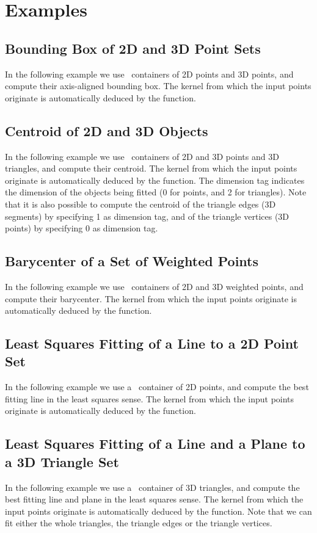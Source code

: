 \section{Examples\label{subsec:pca_examples}}

\subsection{Bounding Box of 2D and 3D Point Sets}
In the following example we use \stl\ containers of 2D points and 3D points, and compute their axis-aligned bounding box. The kernel from which the input points originate is automatically deduced by the function.

\subsection{Centroid of 2D and 3D Objects}
In the following example we use \stl\ containers of 2D and 3D points and 3D triangles, and compute their centroid. The kernel from which the input points originate is automatically deduced by the function. The dimension tag indicates the dimension of the objects being fitted (0 for points, and 2 for triangles). Note that it is also possible to compute the centroid of the triangle edges (3D segments) by specifying 1 as dimension tag, and of the triangle vertices (3D points) by specifying 0 as dimension tag. 

\subsection{Barycenter of a Set of Weighted Points}
In the following example we use \stl\ containers of 2D and 3D weighted points, and compute their barycenter. The kernel from which the input points originate is automatically deduced by the function. 

\subsection{Least Squares Fitting of a Line to a 2D Point Set}
In the following example we use a \stl\ container of 2D points, and compute the best fitting line in the least squares sense. The kernel from which the input points originate is automatically deduced by the function.

\subsection{Least Squares Fitting of a Line and a Plane to a 3D Triangle Set}
In the following example we use a \stl\ container of 3D triangles, and compute the best fitting line and plane in the least squares sense. The kernel from which the input points originate is automatically deduced by the function. Note that we can fit either the whole triangles, the triangle edges or the triangle vertices.

